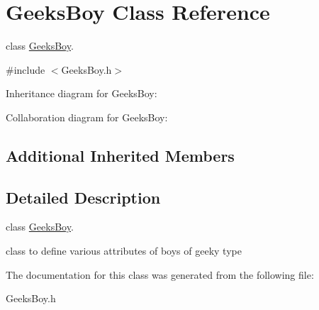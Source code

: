 \hypertarget{classGeeksBoy}{}\section{Geeks\+Boy Class Reference}
\label{classGeeksBoy}


class \hyperlink{classGeeksBoy}{Geeks\+Boy}.  




{\ttfamily \#include $<$Geeks\+Boy.\+h$>$}



Inheritance diagram for Geeks\+Boy\+:


Collaboration diagram for Geeks\+Boy\+:
\subsection*{Additional Inherited Members}


\subsection{Detailed Description}
class \hyperlink{classGeeksBoy}{Geeks\+Boy}. 

class to define various attributes of boys of geeky type 

The documentation for this class was generated from the following file\+:\begin{DoxyCompactItemize}
\item 
Geeks\+Boy.\+h\end{DoxyCompactItemize}
